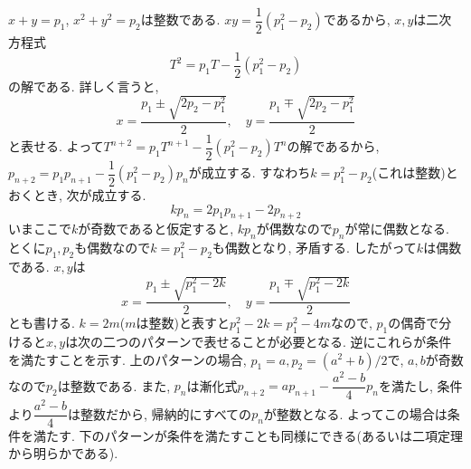 $x+y = p_1$, $x^2 + y^2 = p_2$は整数である. $xy = \dfrac{1}{2}(p_1^2 - p_2)$であるから, $x,y$は二次方程式
\[T^2 = p_1T - \dfrac{1}{2}(p_1^2 - p_2)\]
の解である. 詳しく言うと, 
\[x = \dfrac{p_1 \pm \sqrt{2p_2-p_1^2}}{2},\quad y=\dfrac{p_1 \mp \sqrt{2p_2-p_1^2}}{2}\]
と表せる. よって$T^{n+2} = p_1T^{n+1} - \dfrac{1}{2}(p_1^2-p_2) T^n$の解であるから, $p_{n+2} = p_1 p_{n+1} - \dfrac{1}{2}(p_1^2 - p_2)p_n$が成立する. すなわち$k=p_1^2 - p_2$(これは整数)とおくとき, 次が成立する.
\[kp_n = 2p_1p_{n+1} - 2p_{n+2}\]
いまここで$k$が奇数であると仮定すると, $kp_n$が偶数なので$p_n$が常に偶数となる. とくに$p_1,p_2$も偶数なので$k=p_1^2 - p_2$も偶数となり, 矛盾する. したがって$k$は偶数である. $x,y$は
\[x = \dfrac{p_1 \pm \sqrt{p_1^2 - 2k}}{2},\quad y=\dfrac{p_1 \mp \sqrt{p_1^2 -2k}}{2}\]
とも書ける. $k=2m$($m$は整数)と表すと$p_1^2 - 2k = p_1^2- 4m $なので, $p_1$の偶奇で分けると$x,y$は次の二つのパターンで表せることが必要となる. 
逆にこれらが条件を満たすことを示す. 上のパターンの場合, $p_{1} = a, p_2 = (a^2+b)/2$で, $a,b$が奇数なので$p_2$は整数である. また, $p_n$は漸化式$p_{n+2} = ap_{n+1} - \dfrac{a^2 - b}{4}p_{n}$を満たし, 条件より$\dfrac{a^2-b}{4}$は整数だから, 帰納的にすべての$p_n$が整数となる. よってこの場合は条件を満たす. 下のパターンが条件を満たすことも同様にできる(あるいは二項定理から明らかである). 
